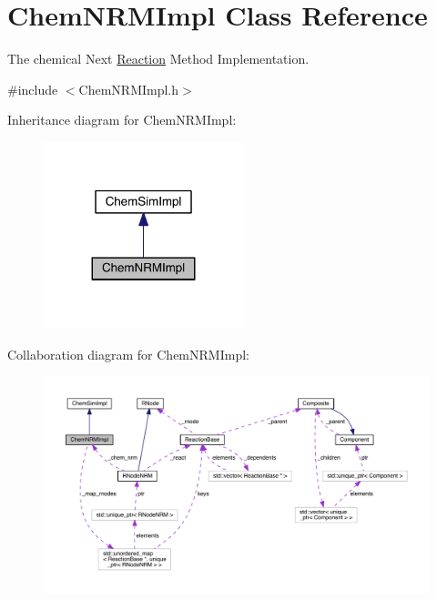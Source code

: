 \hypertarget{classChemNRMImpl}{\section{Chem\+N\+R\+M\+Impl Class Reference}
\label{classChemNRMImpl}
}


The chemical Next \hyperlink{classReaction}{Reaction} Method Implementation.  




{\ttfamily \#include $<$Chem\+N\+R\+M\+Impl.\+h$>$}



Inheritance diagram for Chem\+N\+R\+M\+Impl\+:\nopagebreak
\begin{figure}[H]
\begin{center}
\leavevmode
\includegraphics[width=164pt]{classChemNRMImpl__inherit__graph}
\end{center}
\end{figure}


Collaboration diagram for Chem\+N\+R\+M\+Impl\+:\nopagebreak
\begin{figure}[H]
\begin{center}
\leavevmode
\includegraphics[width=350pt]{classChemNRMImpl__coll__graph}
\end{center}
\end{figure}
